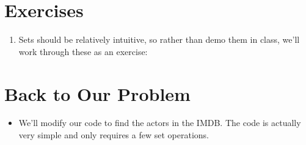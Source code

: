 \documentclass[letterpaper,10pt,english]{sphinxmanual}
\begin{document}
\section{Exercises}
\label{\detokenize{lecture_notes/lec15_sets:exercises}}\begin{enumerate}
\def\theenumi{\arabic{enumi}}
\def\labelenumi{\theenumi .}
\makeatletter\def\p@enumii{\p@enumi \theenumi .}\makeatother
\item {} 
Sets should be relatively intuitive, so rather than demo them in
class, we’ll work through these as an exercise:

\begin{sphinxVerbatim}[commandchars=\\\{\}]
   




    


  


  


  


  


    
  
\end{sphinxVerbatim}

\end{enumerate}


\section{Back to Our Problem}
\label{\detokenize{lecture_notes/lec15_sets:back-to-our-problem}}\begin{itemize}
\item {} 
We’ll modify our code to find the actors in the IMDB. The code is
actually very simple and only requires a few set operations.

\end{itemize}
\end{document}
